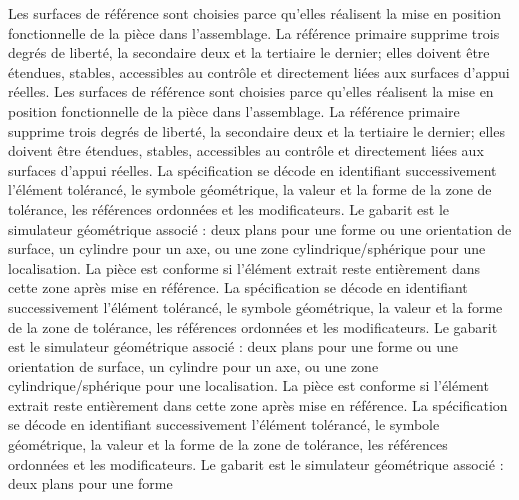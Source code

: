 \begin{corrigebox}
Les surfaces de référence sont choisies parce qu'elles
                réalisent la mise en position fonctionnelle de la pièce dans l'assemblage.
                La référence primaire supprime trois degrés de liberté, la secondaire deux
                et la tertiaire le dernier; elles doivent être étendues, stables,
                accessibles au contrôle et directement liées aux surfaces d'appui réelles.
Les surfaces de référence sont choisies parce qu'elles
                réalisent la mise en position fonctionnelle de la pièce dans l'assemblage.
                La référence primaire supprime trois degrés de liberté, la secondaire deux
                et la tertiaire le dernier; elles doivent être étendues, stables,
                accessibles au contrôle et directement liées aux surfaces d'appui réelles.
La spécification se décode en identifiant successivement
                l'élément tolérancé, le symbole géométrique, la valeur et la forme de la
                zone de tolérance, les références ordonnées et les modificateurs. Le
                gabarit est le simulateur géométrique associé : deux plans pour une forme
                ou une orientation de surface, un cylindre pour un axe, ou une zone
                cylindrique/sphérique pour une localisation. La pièce est conforme si
                l'élément extrait reste entièrement dans cette zone après mise en référence.
La spécification se décode en identifiant successivement
                l'élément tolérancé, le symbole géométrique, la valeur et la forme de la
                zone de tolérance, les références ordonnées et les modificateurs. Le
                gabarit est le simulateur géométrique associé : deux plans pour une forme
                ou une orientation de surface, un cylindre pour un axe, ou une zone
                cylindrique/sphérique pour une localisation. La pièce est conforme si
                l'élément extrait reste entièrement dans cette zone après mise en référence.
La spécification se décode en identifiant successivement
                l'élément tolérancé, le symbole géométrique, la valeur et la forme de la
                zone de tolérance, les références ordonnées et les modificateurs. Le
                gabarit est le simulateur géométrique associé : deux plans pour une forme

\end{corrigebox}
